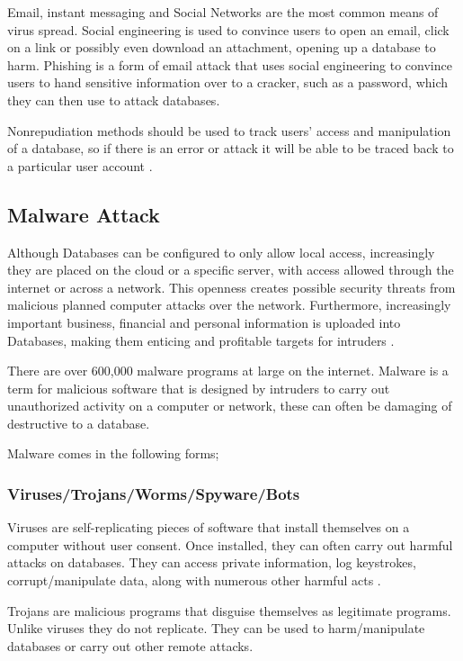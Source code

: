 \documentclass[11pt, twocolumn]{article}
\begin{document}
Email, instant messaging and Social Networks are the most common means of virus spread.  Social engineering is used to convince users to open an email, click on a link or possibly even download an attachment, opening up a database to harm.  Phishing is a form of email attack that uses social engineering to convince users to hand sensitive information over to a cracker, such as a password, which they can then use to attack databases\cite{Bas}.

Nonrepudiation methods should be used to track users’ access and manipulation of a database, so if there is an error or attack it will be able to be traced back to a particular user account \cite{Thur}.

\subsection{Malware Attack}

Although Databases can be configured to only allow local access, increasingly they are placed on the cloud or a specific server, with access allowed through the internet or across a network.  This openness creates possible security threats from malicious planned computer attacks over the network.  Furthermore, increasingly important business, financial and personal information is uploaded into Databases, making them enticing and profitable targets for intruders \cite{Bas}.

There are over 600,000 malware programs at large on the internet.  Malware is a term for malicious software that is designed by intruders to carry out unauthorized activity on a computer or network, these can often be damaging of destructive to a database\cite{Bas}.

Malware comes in the following forms;

\subsubsection{Viruses/Trojans/Worms/Spyware/Bots}
Viruses are self-replicating pieces of software that install themselves on a computer without user consent.  Once installed, they can often carry out harmful attacks on databases.  They can access private information, log keystrokes, corrupt/manipulate data, along with numerous other harmful acts \cite{Bas}.

Trojans are malicious programs that disguise themselves as legitimate programs.  Unlike viruses they do not replicate.  They can be used to harm/manipulate databases or carry out other remote attacks\cite{Bas}.
\end{document}
